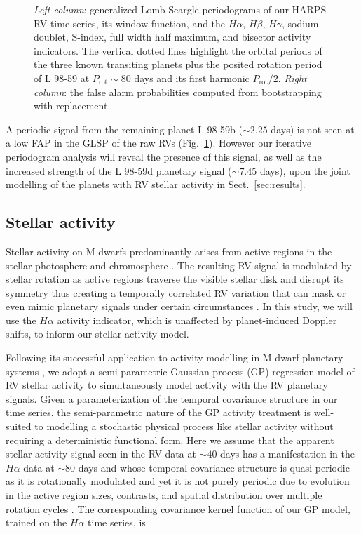\documentclass[longauth]{aa}
\begin{document}
\begin{figure}
    \centering
    \caption{\emph{Left column}: generalized Lomb-Scargle periodograms of our HARPS RV time series, its window function, and the $H\alpha$, $H\beta$, $H\gamma$, sodium doublet, S-index, full width half maximum, and bisector activity indicators. The vertical dotted lines highlight the orbital periods of the three known transiting planets plus the posited rotation period of L 98-59 at $P_{\text{rot}} \sim 80$ days and its first harmonic $P_{\text{rot}}/2$. \emph{Right column}: the false alarm probabilities computed from bootstrapping with replacement.}
    \label{fig:GLSP}
\end{figure}


A periodic signal from the remaining planet L 98-59b ($\sim 2.25$ days) is not seen at a low FAP in the GLSP of the raw RVs (Fig.~\ref{fig:GLSP}). However our iterative periodogram analysis will reveal the presence of this signal, as well as the increased strength of the L 98-59d planetary signal ($\sim 7.45$ days), upon the joint modelling of the planets with RV stellar activity in Sect.~\ref{sec:results}.

\subsection{Stellar activity}
\label{subsec:act}
Stellar activity on M dwarfs predominantly arises from active regions in the stellar photosphere and chromosphere \citep{lindegren03}. The resulting RV signal is modulated by stellar rotation as active regions traverse the visible stellar disk and disrupt its symmetry thus creating a temporally correlated RV variation that can mask or even  mimic planetary signals under certain circumstances \citep{vanderburg16}. In this study, we will use the $H\alpha$ activity indicator, which is unaffected by planet-induced Doppler shifts, to inform our stellar activity model. 

Following its successful application to activity modelling in M dwarf planetary systems \citep[e.g.][]{astudillodefru17c,cloutier17b,bonfils18,cloutier19,ment19}, we adopt a semi-parametric Gaussian process (GP) regression model of RV stellar activity to simultaneously model activity with the RV planetary signals. Given a parameterization of the temporal covariance structure in our time series, the semi-parametric nature of the GP activity treatment is well-suited to modelling a stochastic physical process like stellar activity without requiring a deterministic functional form. Here we assume that the apparent stellar activity signal seen in the RV data at $\sim 40$ days has a manifestation in the $H\alpha$ data at $\sim 80$ days and whose temporal covariance structure is quasi-periodic as it is rotationally modulated and yet it is not purely periodic due to evolution in the active region sizes, contrasts, and spatial distribution over multiple rotation cycles \citep{giles17}. The corresponding covariance kernel function of our GP model, trained on the $H\alpha$ time series, is 
\end{document}
